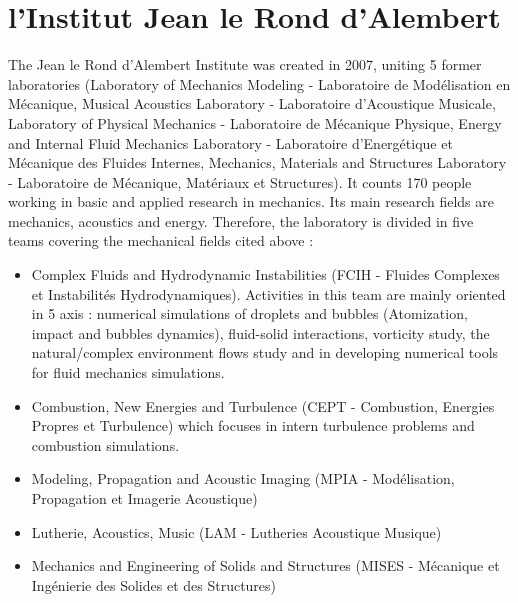 \documentclass[11pt, a4paper, English]{report}
\begin{document}
\section*{l'Institut Jean le Rond d'Alembert}
The Jean le Rond d’Alembert Institute was created in 2007, uniting 5 former laboratories (Laboratory of Mechanics Modeling - Laboratoire de Modélisation en Mécanique, Musical Acoustics Laboratory - Laboratoire d’Acoustique Musicale, Laboratory of Physical Mechanics - Laboratoire de Mécanique Physique, Energy and Internal Fluid Mechanics Laboratory - Laboratoire d’Energétique et Mécanique des Fluides Internes, Mechanics, Materials and Structures Laboratory - Laboratoire de Mécanique, Matériaux et Structures). It counts 170 people working in basic and applied research in mechanics. Its main research fields are mechanics, acoustics and energy. Therefore, the laboratory is divided in five teams covering the mechanical fields cited above  : 
\begin{itemize}
    \item Complex Fluids and Hydrodynamic Instabilities (FCIH - Fluides Complexes et Instabilités Hydrodynamiques). Activities in this team are mainly oriented in 5 axis : numerical simulations of droplets and bubbles (Atomization, impact and bubbles dynamics), fluid-solid interactions, vorticity study, the natural/complex environment flows study and in developing numerical tools for fluid mechanics simulations.
    \item Combustion, New Energies and Turbulence (CEPT - Combustion, Energies Propres et Turbulence) which focuses in intern turbulence problems and combustion simulations.
    \item Modeling, Propagation and Acoustic Imaging (MPIA - Modélisation, Propagation et Imagerie Acoustique)
    \item Lutherie, Acoustics, Music (LAM - Lutheries Acoustique Musique)
    \item Mechanics and Engineering of Solids and Structures (MISES - Mécanique et Ingénierie des Solides et des Structures)
\end{itemize}
\end{document}
